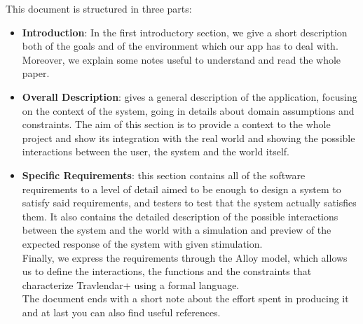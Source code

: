 This document is structured in three parts:
\begin{itemize}
	\item \textbf{Introduction}: In the first introductory section, we give a short description both of the goals and of the environment which our app has to deal with. Moreover, we explain some notes useful to understand and read the whole paper. 
	\item \textbf{Overall Description}: gives a general description of the application, focusing on the context of the system, going in details about domain assumptions and constraints. The aim of this section is to provide a context to the whole project and show its integration with the real world and showing the possible interactions between the user, the system and the world itself. 
	\item \textbf{Specific Requirements}: this section contains all of the software requirements to a level of detail aimed to be enough to design a system to satisfy said requirements, and testers to test that the system actually satisfies them. It also contains the detailed description of the possible interactions between the system and the world with a simulation and preview of the expected response of the system with given stimulation. 
\\Finally, we express the requirements through the Alloy model, which allows us to define the interactions, the functions and the constraints that characterize Travlendar+ using a formal language.\\
The document ends with a short note about the effort spent in producing it and at last you can also find useful references.
\end{itemize}